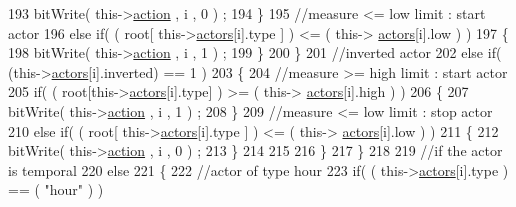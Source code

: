 \begin{DoxyCode}
193                             bitWrite( this->\hyperlink{classJetpack_aca3142925a7b0834b34ae91d26af7765}{action} , i , 0 ) ;    
194                         \}
195                         \textcolor{comment}{//measure <= low limit : start actor}
196                         \textcolor{keywordflow}{else} \textcolor{keywordflow}{if}( ( root[ this->\hyperlink{classJetpack_a7e16d2f97837f9712a2e6de1c50d99db}{actors}[i].type ] ) <= ( this->
      \hyperlink{classJetpack_a7e16d2f97837f9712a2e6de1c50d99db}{actors}[i].low ) )
197                         \{
198                             bitWrite( this->\hyperlink{classJetpack_aca3142925a7b0834b34ae91d26af7765}{action} , i , 1 ) ;                    
199                         \}
200                     \}
201                     \textcolor{comment}{//inverted actor}
202                     \textcolor{keywordflow}{else} \textcolor{keywordflow}{if}( (this->\hyperlink{classJetpack_a7e16d2f97837f9712a2e6de1c50d99db}{actors}[i].inverted) == 1 )
203                     \{
204                         \textcolor{comment}{//measure >= high limit : start actor}
205                         \textcolor{keywordflow}{if}( ( root[this->\hyperlink{classJetpack_a7e16d2f97837f9712a2e6de1c50d99db}{actors}[i].type] ) >= ( this->
      \hyperlink{classJetpack_a7e16d2f97837f9712a2e6de1c50d99db}{actors}[i].high ) )    
206                         \{   
207                             bitWrite( this->\hyperlink{classJetpack_aca3142925a7b0834b34ae91d26af7765}{action} , i , 1 ) ;    
208                         \}
209                         \textcolor{comment}{//measure <= low limit : stop actor}
210                         \textcolor{keywordflow}{else} \textcolor{keywordflow}{if}( ( root[ this->\hyperlink{classJetpack_a7e16d2f97837f9712a2e6de1c50d99db}{actors}[i].type ] ) <= ( this->
      \hyperlink{classJetpack_a7e16d2f97837f9712a2e6de1c50d99db}{actors}[i].low ) )
211                         \{
212                             bitWrite( this->\hyperlink{classJetpack_aca3142925a7b0834b34ae91d26af7765}{action} , i , 0 ) ;                    
213                         \}
214 
215                     
216                     \}
217                 \}
218 
219                 \textcolor{comment}{//if the actor is temporal}
220                 \textcolor{keywordflow}{else}
221                 \{
222                     \textcolor{comment}{//actor of type hour}
223                     \textcolor{keywordflow}{if}( ( this->\hyperlink{classJetpack_a7e16d2f97837f9712a2e6de1c50d99db}{actors}[i].type ) == ( \textcolor{stringliteral}{"hour"} ) )  

\end{DoxyCode}
